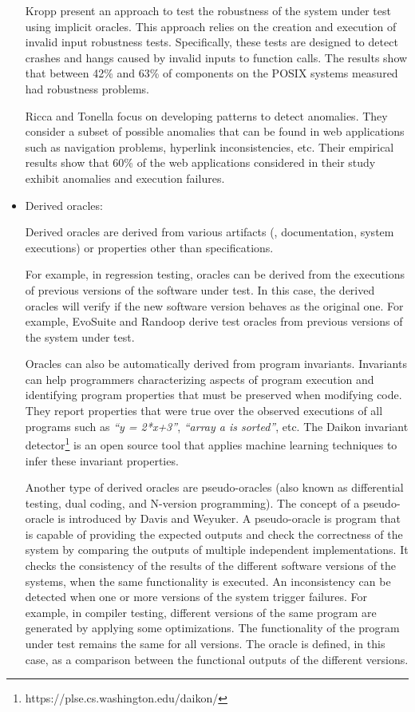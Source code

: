 \begin{itemize}
	Kropp \etal\cite{kropp1998automated} present an approach to test the robustness of the system under test using implicit oracles.
	This approach relies on the creation and execution of invalid input robustness tests. Specifically, these tests are designed to detect crashes and hangs caused by invalid inputs to function calls. The results show that between 42\% and 63\% of components on the POSIX systems measured had robustness problems. 
	
	Ricca and Tonella\cite{ricca2006detecting} focus on developing patterns to detect anomalies. They consider a subset of possible anomalies that can be found in web applications such as navigation problems, hyperlink inconsistencies, etc. Their empirical results show that 60\% of the web applications considered in their study exhibit anomalies and execution failures.
	
	
	\item Derived oracles:
	
	Derived oracles are derived from various artifacts (\eg, documentation, system executions) or properties other than specifications.
	
	For example, in regression testing, oracles can be derived from the executions of previous versions of the software under test. In this case, the derived oracles will verify if the new software version behaves as the original one\cite{mariani2007compatibility}. For example, EvoSuite and Randoop derive test oracles from previous versions of the system under test.
	
	Oracles can also be automatically derived from program invariants\cite{ernst2000quickly}. Invariants can help programmers characterizing aspects of program execution and identifying program properties that must be preserved when modifying code. They report properties that were true over the observed executions of all programs such as \textit{``y = 2*x+3''}, \textit{``array a is sorted''}, etc. The Daikon invariant detector\footnote{https://plse.cs.washington.edu/daikon/} is an open source tool that applies machine learning techniques to infer these invariant properties.
	
	Another type of derived oracles are pseudo-oracles (also known as differential testing, dual coding, and N-version programming\cite{patrick2016testing}). 
	The concept of a pseudo-oracle is introduced by Davis and Weyuker\cite{davis1981pseudo}.
	A pseudo-oracle is program that is capable of providing the expected outputs and check the correctness of the system by comparing the outputs of multiple independent implementations. 
	It checks the consistency of the results of the different software versions of the systems, when the same functionality is executed. An inconsistency can be detected when one or more versions of the system trigger failures. 
	For example, in compiler testing, different versions of the same program are generated by applying some optimizations. The functionality of the program under test remains the same for all versions. The oracle is defined, in this case, as a comparison between the functional outputs of the different versions\cite{yang2011finding}.
	

\end{itemize}
